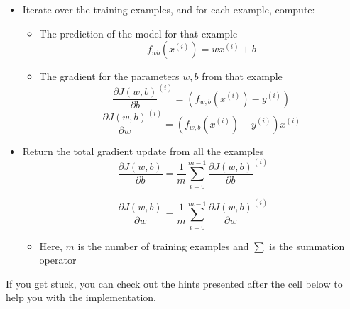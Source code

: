 \documentclass[11pt]{article}
\providecommand{\tightlist}{%
      \setlength{\itemsep}{0pt}\setlength{\parskip}{0pt}}
\begin{document}
\begin{itemize}
\item
  Iterate over the training examples, and for each example, compute:

  \begin{itemize}
  \item
    The prediction of the model for that example \[
      f_{wb}(x^{(i)}) =  wx^{(i)} + b 
      \]
  \item
    The gradient for the parameters \(w, b\) from that example \[
      \frac{\partial J(w,b)}{\partial b}^{(i)}  =  (f_{w,b}(x^{(i)}) - y^{(i)}) 
      \] \[
      \frac{\partial J(w,b)}{\partial w}^{(i)}  =  (f_{w,b}(x^{(i)}) -y^{(i)})x^{(i)} 
      \]
  \end{itemize}
\item
  Return the total gradient update from all the examples \[
    \frac{\partial J(w,b)}{\partial b}  = \frac{1}{m} \sum\limits_{i = 0}^{m-1} \frac{\partial J(w,b)}{\partial b}^{(i)}
    \]

  \[
    \frac{\partial J(w,b)}{\partial w}  = \frac{1}{m} \sum\limits_{i = 0}^{m-1} \frac{\partial J(w,b)}{\partial w}^{(i)} 
    \]

  \begin{itemize}
  \tightlist
  \item
    Here, \(m\) is the number of training examples and \(\sum\) is the
    summation operator
  \end{itemize}
\end{itemize}

If you get stuck, you can check out the hints presented after the cell
below to help you with the implementation.
\end{document}
